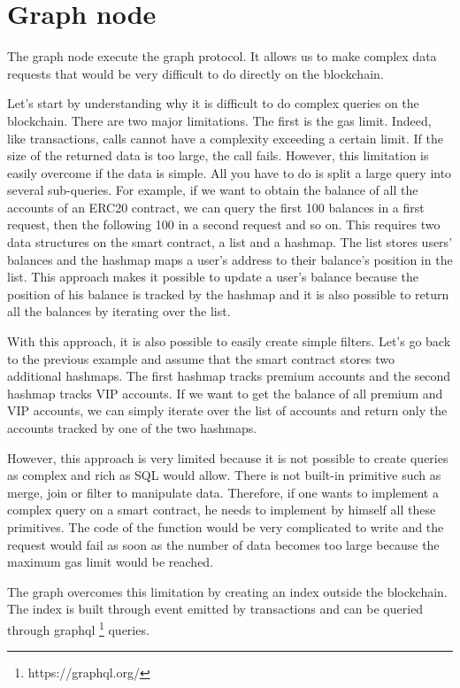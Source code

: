 \documentclass[a4paper,11pt,oneside]{report}
\begin{document}
\section{Graph node}
The graph node execute the graph protocol. It allows us to make complex data requests that would be very difficult to do directly on the blockchain.

Let's start by understanding why it is difficult to do complex queries on the blockchain. There are two major limitations. The first is the gas limit. Indeed, like transactions, calls cannot have a complexity exceeding a certain limit. If the size of the returned data is too large, the call fails. However, this limitation is easily overcome if the data is simple. All you have to do is split a large query into several sub-queries. For example, if we want to obtain the balance of all the accounts of an ERC20 contract, we can query the first 100 balances in a first request, then the following 100 in a second request and so on. This requires two data structures on the smart contract, a list and a hashmap. The list stores users' balances and the hashmap maps a user's address to their balance's position in the list. This approach makes it possible to update a user's balance because the position of his balance is tracked by the hashmap and it is also possible to return all the balances by iterating over the list.

With this approach, it is also possible to easily create simple filters. Let's go back to the previous example and assume that the smart contract stores two additional hashmaps. The first hashmap tracks premium accounts and the second hashmap tracks VIP accounts. If we want to get the balance of all premium and VIP accounts, we can simply iterate over the list of accounts and return only the accounts tracked by one of the two hashmaps.

However, this approach is very limited because it is not possible to create queries as complex and rich as SQL would allow. There is not built-in primitive such as merge, join or filter to manipulate data. Therefore, if one wants to implement a complex query on a smart contract, he needs to implement by himself all these primitives. The code of the function would be very complicated to write and the request would fail as soon as the number of data becomes too large because the maximum gas limit would be reached.

The graph overcomes this limitation by creating an index outside the blockchain. The index is built through event emitted by transactions and can be queried through graphql \footnote{https://graphql.org/} queries.
\end{document}
